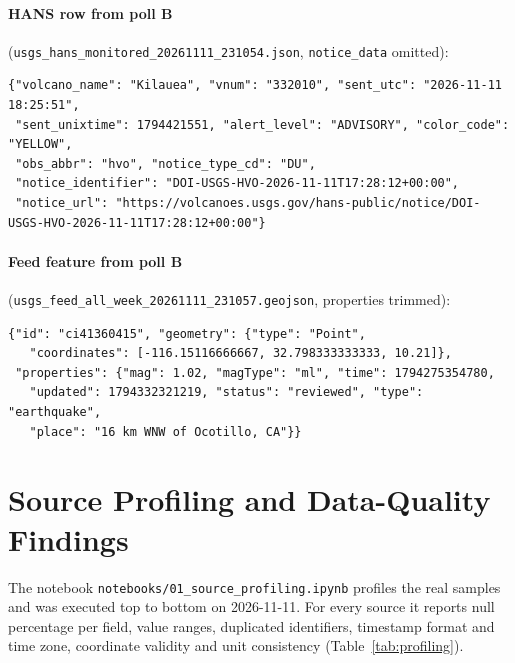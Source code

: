 \documentclass[11pt,a4paper]{article}
\begin{document}
\paragraph{HANS row from poll B}
(\texttt{usgs\_hans\_monitored\_20261111\_231054.json}, \texttt{notice\_data}
omitted):

\begin{lstlisting}
{"volcano_name": "Kilauea", "vnum": "332010", "sent_utc": "2026-11-11 18:25:51",
 "sent_unixtime": 1794421551, "alert_level": "ADVISORY", "color_code": "YELLOW",
 "obs_abbr": "hvo", "notice_type_cd": "DU",
 "notice_identifier": "DOI-USGS-HVO-2026-11-11T17:28:12+00:00",
 "notice_url": "https://volcanoes.usgs.gov/hans-public/notice/DOI-USGS-HVO-2026-11-11T17:28:12+00:00"}
\end{lstlisting}

\paragraph{Feed feature from poll B}
(\texttt{usgs\_feed\_all\_week\_20261111\_231057.geojson}, properties trimmed):

\begin{lstlisting}
{"id": "ci41360415", "geometry": {"type": "Point",
   "coordinates": [-116.15116666667, 32.798333333333, 10.21]},
 "properties": {"mag": 1.02, "magType": "ml", "time": 1794275354780,
   "updated": 1794332321219, "status": "reviewed", "type": "earthquake",
   "place": "16 km WNW of Ocotillo, CA"}}
\end{lstlisting}

\section{Source Profiling and Data-Quality Findings}
\label{sec:profiling}

The notebook \texttt{notebooks/01\_source\_profiling.ipynb} profiles the real samples
and was executed top to bottom on 2026-11-11. For every source it reports null
percentage per field, value ranges, duplicated identifiers, timestamp format and time
zone, coordinate validity and unit consistency (Table~\ref{tab:profiling}).
\end{document}
